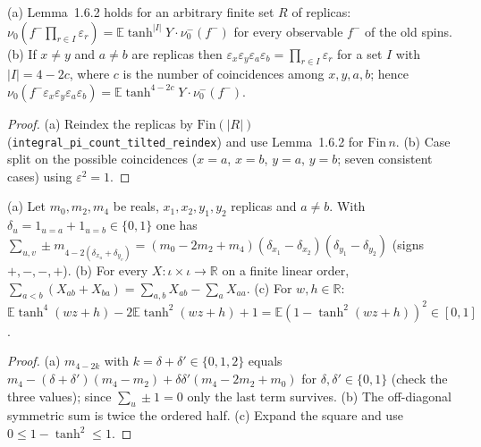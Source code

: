 \begin{lemma}
\label{lem:sg-tal:decoupled-monomials}
  \leanok
{}
(a) Lemma~1.6.2 holds for an arbitrary finite set $R$ of replicas: $\nu_0(f^-\prod_{r\in I}\varepsilon_r)=\mathbb E\tanh^{|I|}Y\cdot\nu_0^-(f^-)$ for every observable $f^-$ of the old spins.  (b) If $x\ne y$ and $a\ne b$ are replicas then $\varepsilon_x\varepsilon_y\varepsilon_a\varepsilon_b=\prod_{r\in I}\varepsilon_r$ for a set $I$ with $|I|=4-2c$, where $c$ is the number of coincidences among $x,y,a,b$; hence $\nu_0(f^-\varepsilon_x\varepsilon_y\varepsilon_a\varepsilon_b)=\mathbb E\tanh^{4-2c}Y\cdot\nu_0^-(f^-)$.
\end{lemma}
\begin{proof}
  \leanok
(a) Reindex the replicas by $\mathrm{Fin}(|R|)$ (\texttt{integral\_pi\_count\_tilted\_reindex}) and use Lemma~1.6.2 for $\mathrm{Fin}\,n$.  (b) Case split on the possible coincidences ($x=a$, $x=b$, $y=a$, $y=b$; seven consistent cases) using $\varepsilon^2=1$.
\end{proof}

\begin{lemma}
\label{lem:sg-tal:rect-algebra}
  \leanok
{}
(a) Let $m_0,m_2,m_4$ be reals, $x_1,x_2,y_1,y_2$ replicas and $a\ne b$.  With $\delta_u=1_{u=a}+1_{u=b}\in\{0,1\}$ one has
$\sum_{u,v}\pm m_{4-2(\delta_{x_u}+\delta_{y_v})}=(m_0-2m_2+m_4)(\delta_{x_1}-\delta_{x_2})(\delta_{y_1}-\delta_{y_2})$ (signs $+,-,-,+$).  (b) For every $X:\iota\times\iota\to\mathbb R$ on a finite linear order, $\sum_{a<b}(X_{ab}+X_{ba})=\sum_{a,b}X_{ab}-\sum_aX_{aa}$.  (c) For $w,h\in\mathbb R$: $\mathbb E\tanh^4(wz+h)-2\mathbb E\tanh^2(wz+h)+1=\mathbb E(1-\tanh^2(wz+h))^2\in[0,1]$.
\end{lemma}
\begin{proof}
  \leanok
(a) $m_{4-2k}$ with $k=\delta+\delta'\in\{0,1,2\}$ equals $m_4-(\delta+\delta')(m_4-m_2)+\delta\delta'(m_4-2m_2+m_0)$ for $\delta,\delta'\in\{0,1\}$ (check the three values); since $\sum_u\pm1=0$ only the last term survives.  (b) The off-diagonal symmetric sum is twice the ordered half.  (c) Expand the square and use $0\le1-\tanh^2\le1$.
\end{proof}

